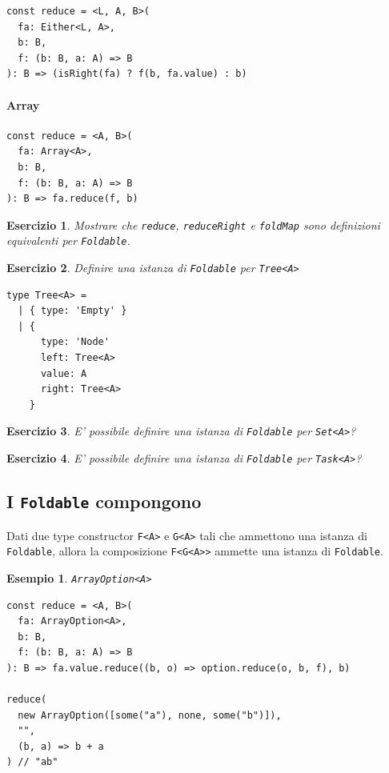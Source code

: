 \documentclass[12pt]{article}
\newtheorem{example}{Esempio}[section]
\newtheorem{exercise}{Esercizio}[section]
\begin{document}
\begin{verbatim}
const reduce = <L, A, B>(
  fa: Either<L, A>,
  b: B,
  f: (b: B, a: A) => B
): B => (isRight(fa) ? f(b, fa.value) : b)
\end{verbatim}

\paragraph{Array}

\begin{verbatim}
const reduce = <A, B>(
  fa: Array<A>,
  b: B,
  f: (b: B, a: A) => B
): B => fa.reduce(f, b)
\end{verbatim}

\begin{exercise}
Mostrare che \texttt{reduce}, \texttt{reduceRight} e \texttt{foldMap} sono definizioni equivalenti per \texttt{Foldable}.
\end{exercise}

\begin{exercise}
Definire una istanza di \texttt{Foldable} per \texttt{Tree<A>}

\begin{verbatim}
type Tree<A> =
  | { type: 'Empty' }
  | {
      type: 'Node'
      left: Tree<A>
      value: A
      right: Tree<A>
    }
\end{verbatim}
\end{exercise}

\begin{exercise}
E' possibile definire una istanza di \texttt{Foldable} per \texttt{Set<A>}?
\end{exercise}

\begin{exercise}
E' possibile definire una istanza di \texttt{Foldable} per \texttt{Task<A>}?
\end{exercise}

\subsection{I \texttt{Foldable} compongono}

Dati due type constructor \texttt{F<A>} e \texttt{G<A>} tali che ammettono una istanza di \texttt{Foldable}, allora la composizione \texttt{F<G<A>>}
ammette una istanza di \texttt{Foldable}.

\begin{example}
\texttt{ArrayOption<A>}

\begin{verbatim}
const reduce = <A, B>(
  fa: ArrayOption<A>,
  b: B,
  f: (b: B, a: A) => B
): B => fa.value.reduce((b, o) => option.reduce(o, b, f), b)

reduce(
  new ArrayOption([some("a"), none, some("b")]),
  "",
  (b, a) => b + a
) // "ab"
\end{verbatim}
\end{example}
\end{document}
